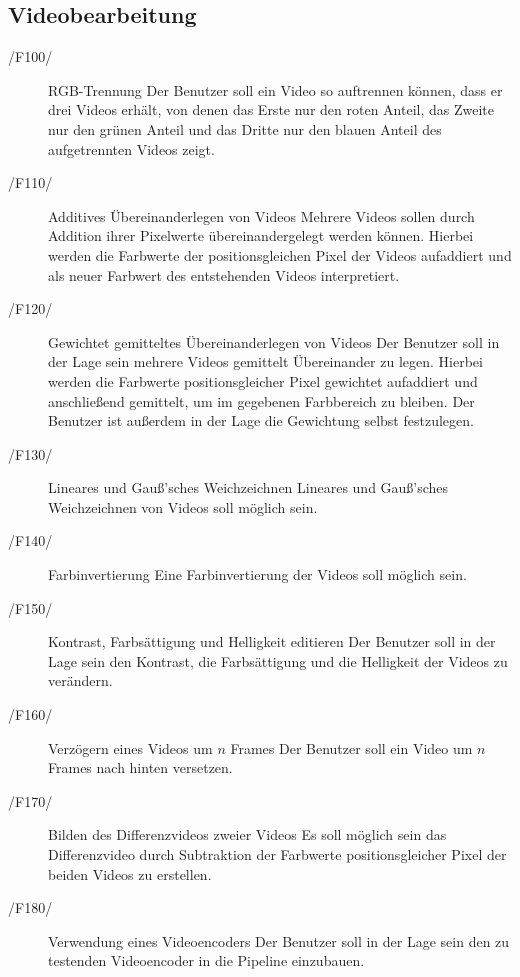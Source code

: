 \subsection{Videobearbeitung}
\begin{description}
        \item[/F100/]RGB-Trennung \newline
                 Der Benutzer soll ein Video so auftrennen können, dass er drei Videos erhält, von denen das Erste nur den roten Anteil, das Zweite nur den grünen Anteil und das Dritte nur den blauen Anteil des aufgetrennten Videos zeigt.
        \item[/F110/]Additives  Übereinanderlegen von Videos \newline
                Mehrere Videos sollen durch Addition ihrer Pixelwerte übereinandergelegt werden können. Hierbei werden die Farbwerte der positionsgleichen Pixel der Videos aufaddiert und als neuer Farbwert des entstehenden Videos interpretiert.
        \item[/F120/]Gewichtet gemitteltes Übereinanderlegen von  Videos \newline
                Der Benutzer soll in der Lage sein mehrere Videos gemittelt Übereinander zu legen. Hierbei werden die Farbwerte positionsgleicher Pixel gewichtet aufaddiert und anschließend gemittelt, um im gegebenen Farbbereich zu bleiben. Der Benutzer ist außerdem in der Lage die Gewichtung selbst festzulegen.
        \item[/F130/]Lineares und Gauß'sches Weichzeichnen \newline
                Lineares und Gauß'sches Weichzeichnen von Videos soll möglich sein.
        \item[/F140/]Farbinvertierung \newline
                Eine Farbinvertierung der Videos soll möglich sein.
        \item[/F150/]Kontrast, Farbsättigung und Helligkeit editieren \newline
                Der Benutzer soll in der Lage sein den Kontrast, die Farbsättigung und die Helligkeit der Videos zu verändern.
        \item[/F160/]Verzögern eines Videos um $n$ Frames \newline
                Der Benutzer soll ein Video um $n$ Frames nach hinten versetzen.       
        \item[/F170/]Bilden des Differenzvideos zweier Videos \newline
                Es soll möglich sein das Differenzvideo durch Subtraktion der Farbwerte positionsgleicher Pixel der beiden Videos zu erstellen.
	\item[/F180/]Verwendung eines Videoencoders \newline
		Der Benutzer soll in der Lage sein den zu testenden Videoencoder in die Pipeline einzubauen.
\end{description}
 
